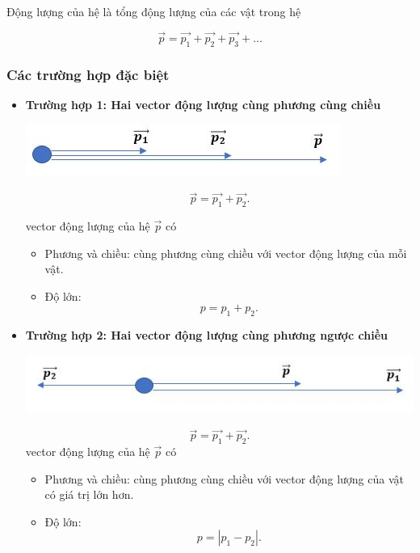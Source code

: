 Động lượng của hệ là tổng động lượng của các vật trong hệ

\begin{equation*}
	\vec {p} = \vec {p_1} + \vec{p_2}+\vec{p_3}+...
\end{equation*}
\subsubsection{Các trường hợp đặc biệt}
\begin{itemize}
	\item \textbf{Trường hợp 1: Hai vector động lượng cùng phương cùng chiều} 
	\begin{center}
		\includegraphics[scale=0.6]{../figs/VN10-PH-29-L-021-2-1.JPG}
	\end{center}
	\begin{equation*}
		\vec {p} = \vec {p_1} + \vec{p_2}.
	\end{equation*}
	
	vector động lượng của hệ $\vec{p}$ có 
	\begin{itemize}
		\item Phương và chiều: cùng phương cùng chiều với vector động lượng của mỗi vật.
		\item Độ lớn: $$p=p_1+p_2.$$ 
	\end{itemize}
	
	\item \textbf{Trường hợp 2: Hai vector động lượng cùng phương ngược chiều}
	\begin{center}
		\includegraphics[scale=0.6]{../figs/VN10-PH-29-L-021-2-2.JPG}
	\end{center}
	\begin{equation*}
		\vec {p} = \vec {p_1} + \vec{p_2}.
	\end{equation*}
	vector động lượng của hệ $\vec{p}$ có 
	\begin{itemize}
		\item Phương và chiều: cùng phương cùng chiều với vector động lượng của vật có giá trị lớn hơn.
		\item Độ lớn: $$p=|p_1-p_2|.$$
	\end{itemize}
	

\end{itemize}
